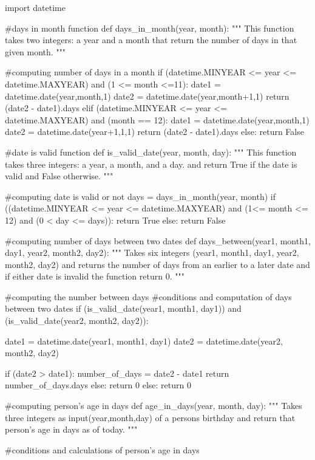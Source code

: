 import datetime

#days in month function
def days_in_month(year, month):
    """
    This function takes two integers: a year and a month that return the number
    of days in that given month.
    """

    #computing number of days in a month
    if (datetime.MINYEAR <= year <= datetime.MAXYEAR) and (1 <= month <=11):
        date1 = datetime.date(year,month,1)
        date2 = datetime.date(year,month+1,1)
        return (date2 - date1).days
    elif (datetime.MINYEAR <= year <= datetime.MAXYEAR) and (month == 12):
        date1 = datetime.date(year,month,1)
        date2 = datetime.date(year+1,1,1)
        return (date2 - date1).days
    else:
        return False



#date is valid function
def is_valid_date(year, month, day):
    """
    This function takes three integers: a year, a month, and a day. and return
    True if the date is valid and False otherwise.
    """

    #computing date is valid or not
    days = days_in_month(year, month)
    if ((datetime.MINYEAR <= year <= datetime.MAXYEAR) and (1<= month <= 12) and (0 < day <= days)):
        return True
    else:
        return False

#computing number of days between two dates
def days_between(year1, month1, day1, year2, month2, day2):
    """
    Takes six integers (year1, month1, day1, year2, month2, day2) and returns
    the number of days from an earlier to a later date and if either date is
    invalid the function return 0.
    """

    #computing the number between days
    #conditions and computation of days between two dates
    if (is_valid_date(year1, month1, day1)) and (is_valid_date(year2, month2, day2)):

        date1 = datetime.date(year1, month1, day1)
        date2 = datetime.date(year2, month2, day2)

        if (date2 > date1):
            number_of_days = date2 - date1
            return number_of_days.days
        else:
            return 0
    else:
        return 0


#computing person's age in days
def age_in_days(year, month, day):
    """
    Takes three integers as input(year,month,day) of a persons
    birthday and return that person's age in days as of today.
    """

    #conditions and calculations of person's age in days

